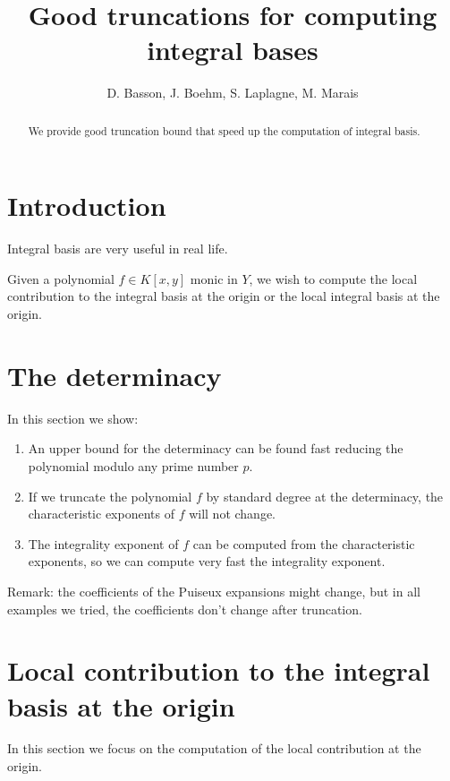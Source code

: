 \documentclass[a4paper,11pt]{amsart}%
\theoremstyle{definition}
\theoremstyle{plain}
\theoremstyle{remark}
\begin{document}
\title[Good truncations for computing integral bases]{Good truncations for computing integral bases}
\author{D. Basson, J. Boehm, S. Laplagne, M. Marais}

\begin{abstract}
We provide good truncation bound that speed up the computation of integral basis.
\end{abstract}
\maketitle

\section{Introduction}
\label{section:introduction}

Integral basis are very useful in real life.

Given a polynomial $f \in K[x,y]$ monic in $Y$, we wish to compute the local contribution to the integral basis at the origin or the local integral basis at the origin.


\section{The determinacy}
\label{section:directApproach}

In this section we show:
\begin{enumerate}
\item An upper bound for the determinacy can be found fast reducing the polynomial modulo any prime number $p$.
\item If we truncate the polynomial $f$ by standard degree at the determinacy, the characteristic exponents of $f$ will not change.
\item The integrality exponent of $f$ can be computed from the characteristic exponents, so we can compute very fast the integrality exponent.
\end{enumerate}

Remark: the coefficients of the Puiseux expansions might change, but in all examples we tried, the coefficients don't change after truncation.

\section{Local contribution to the integral basis at the origin}

In this section we focus on the computation of the local contribution at the origin.
\end{document}
